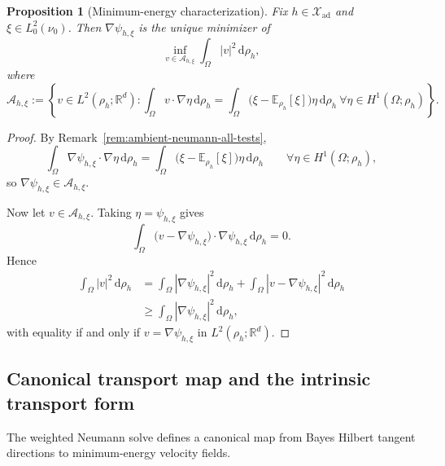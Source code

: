 \documentclass{article}
\newtheorem{proposition}[theorem]{Proposition}
\theoremstyle{definition}
\renewcommand{\d}{\mathrm{d}}
\begin{document}
\begin{proposition}[Minimum-energy characterization]
    \label{prop:ambient-min-energy}
    Fix \(h\in\mathcal X_{\mathrm{ad}}\) and \(\xi\in L^2_0(\nu_0)\). Then \(\nabla\psi_{h,\xi}\) is the
    unique minimizer of
    \begin{equation}
        \label{eq:ambient-min-energy}
        \inf_{v\in\mathcal A_{h,\xi}}
        \int_\Omega |v|^2\,\d\rho_h,
    \end{equation}
    where
    \begin{equation}
        \label{eq:ambient-admissible-velocities}
        \mathcal A_{h,\xi}
        :=
        \left\{
        v\in L^2(\rho_h;\mathbb R^d):
        \int_\Omega v\cdot\nabla\eta\,\d\rho_h
        =
        \int_\Omega
        \bigl(\xi-\mathbb E_{\rho_h}[\xi]\bigr)\eta\,\d\rho_h
        \ \forall \eta\in H^1(\Omega;\rho_h)
        \right\}.
    \end{equation}
\end{proposition}

\begin{proof}
    By Remark~\ref{rem:ambient-neumann-all-tests},
    \[
        \int_\Omega \nabla\psi_{h,\xi}\cdot\nabla\eta\,\d\rho_h
        =
        \int_\Omega
        \bigl(\xi-\mathbb E_{\rho_h}[\xi]\bigr)\eta\,\d\rho_h
        \qquad
        \forall \eta\in H^1(\Omega;\rho_h),
    \]
    so \(\nabla\psi_{h,\xi}\in\mathcal A_{h,\xi}\).

    Now let \(v\in\mathcal A_{h,\xi}\). Taking \(\eta=\psi_{h,\xi}\) gives
    \[
        \int_\Omega \bigl(v-\nabla\psi_{h,\xi}\bigr)\cdot\nabla\psi_{h,\xi}\,\d\rho_h=0.
    \]
    Hence
    \begin{align*}
        \int_\Omega |v|^2\,\d\rho_h
         & =
        \int_\Omega |\nabla\psi_{h,\xi}|^2\,\d\rho_h
        +
        \int_\Omega |v-\nabla\psi_{h,\xi}|^2\,\d\rho_h \\
         & \ge
        \int_\Omega |\nabla\psi_{h,\xi}|^2\,\d\rho_h,
    \end{align*}
    with equality if and only if \(v=\nabla\psi_{h,\xi}\) in \(L^2(\rho_h;\mathbb R^d)\).
\end{proof}

\subsection{Canonical transport map and the intrinsic transport form}

The weighted Neumann solve defines a canonical map from Bayes Hilbert tangent directions to
minimum-energy velocity fields.
\end{document}
